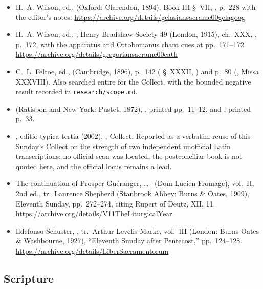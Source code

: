 \begin{itemize}[leftmargin=1.2em, itemsep=0.15em]
\item H.~A. Wilson, ed.,  (Oxford: Clarendon, 1894), Book III §~VII, , p.~228 with the editor's notes.
\url{https://archive.org/details/gelasiansacrame00gelagoog}
\item H.~A. Wilson, ed., , Henry Bradshaw Society 49 (London, 1915), ch.\ XXX, , p.~172, with the apparatus and Ottobonianus chant cues
at pp.~171--172. \url{https://archive.org/details/gregoriansacrame00cath}
\item C.~L. Feltoe, ed.,  (Cambridge, 1896),
p.~142 ( §~XXXII, ) and p.~80
(, Missa XXXVIII). Also searched entire for the Collect,
with the bounded negative result recorded in \texttt{research/scope.md}.
\item {}
(Ratisbon and New York: Pustet, 1872), ,
printed pp.~11--12, and , printed p.~33.
\item {}, editio typica tertia (2002), , Collect. Reported as a verbatim reuse of this Sunday's
Collect on the strength of two independent unofficial Latin transcriptions; no
official scan was located, the postconciliar book is not quoted here, and the
official locus remains a lead.
\item The continuation of Prosper Guéranger,  \dots\
 (Dom Lucien Fromage), vol.~II, 2nd ed., tr.\
Laurence Shepherd (Stanbrook Abbey: Burns
\& Oates, 1909), Eleventh Sunday, pp.~272--274, citing Rupert of Deutz,
\work{De divinis officiis} XII, 11.
\url{https://archive.org/details/V11TheLiturgicalYear}
\item Ildefonso Schuster, , tr.\
Arthur Levelis-Marke, vol.~III (London: Burns Oates \& Washbourne, 1927),
``Eleventh Sunday after Pentecost,'' pp.~124--128.
\url{https://archive.org/details/LiberSacramentorum}
\end{itemize}

\subsection*{Scripture}

